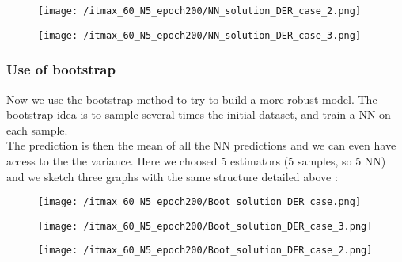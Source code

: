 \documentclass[a4paper,12pt]{report}
\numberwithin{equation}{section} %
\begin{document}
\begin{figure}[H]
\centering
\texttt{[image: /itmax\_60\_N5\_epoch200/NN\_solution\_DER\_case\_2.png]}
\caption{}
\label{derN5_200_c2}
\end{figure}

\begin{figure}[H]
\centering
\texttt{[image: /itmax\_60\_N5\_epoch200/NN\_solution\_DER\_case\_3.png]}
\caption{}
\label{derN5_200_c3}
\end{figure}

\pagebreak

\subsubsection*{Use of bootstrap}
\noindent Now we use the bootstrap method to try to build a more robust model. The bootstrap idea is to sample several times the initial dataset, and train a NN on each sample. \\
The prediction is then the mean of all the NN predictions and we can even have access to the the variance. Here we choosed 5 estimators (5 samples, so 5 NN) and we sketch three graphs with the same structure detailed above :

\begin{figure}[H]
\centering
\texttt{[image: /itmax\_60\_N5\_epoch200/Boot\_solution\_DER\_case.png]}
\label{bootderN5_200_c1}
\end{figure}

\begin{figure}[H]
\centering
\texttt{[image: /itmax\_60\_N5\_epoch200/Boot\_solution\_DER\_case\_3.png]}
\label{booderN5_200_c3}
\end{figure}

\begin{figure}[H]
\centering
\texttt{[image: /itmax\_60\_N5\_epoch200/Boot\_solution\_DER\_case\_2.png]}
\caption{}
\label{bootderN5_200_c2}
\end{figure}
\end{document}
